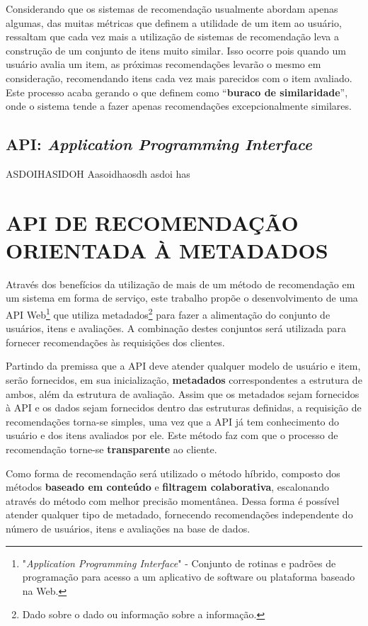 \documentclass[12pt, openright, oneside, a4paper, brazil]{abntex2}
\begin{document}
Considerando que os sistemas de recomendação usualmente abordam apenas algumas, das muitas métricas que definem a utilidade de um item ao usuário,  ressaltam que cada vez mais a utilização de sistemas de recomendação leva a construção de um conjunto de itens muito similar. Isso ocorre pois quando um usuário avalia um item, as próximas recomendações levarão o mesmo em consideração, recomendando itens cada vez mais parecidos com o item avaliado. Este processo acaba gerando o que  definem como “\textbf{buraco de similaridade}”, onde o sistema tende a fazer apenas recomendações excepcionalmente similares.

\section{API: \textit{Application Programming Interface}}

ASDOIHASIDOH Aasoidhaosdh asdoi has

%
%

\chapter{API DE RECOMENDAÇÃO ORIENTADA À METADADOS}

Através dos benefícios da utilização de mais de um método de recomendação em um sistema em forma de serviço, este trabalho propõe o desenvolvimento de uma API Web\footnote{"\textit{Application Programming Interface}" - Conjunto de rotinas e padrões de programação para acesso a um aplicativo de software ou plataforma baseado na Web.} que utiliza metadados\footnote{Dado sobre o dado ou informação sobre a informação.} para fazer a alimentação do conjunto de usuários, itens e avaliações. A combinação destes conjuntos será utilizada para fornecer recomendações às requisições dos clientes.

Partindo da premissa que a API deve atender qualquer modelo de usuário e item, serão fornecidos, em sua inicialização, \textbf{metadados} correspondentes a estrutura de ambos, além da estrutura de avaliação. Assim que os metadados sejam fornecidos à API e os dados sejam fornecidos dentro das estruturas definidas, a requisição de recomendações torna-se simples, uma vez que a API já tem conhecimento do usuário e dos itens avaliados por ele. Este método faz com que o processo de recomendação torne-se \textbf{transparente} ao cliente.

Como forma de recomendação será utilizado o método híbrido, composto dos métodos \textbf{baseado em conteúdo} e \textbf{filtragem colaborativa}, escalonando através do método com melhor precisão momentânea. Dessa forma é possível atender qualquer tipo de metadado, fornecendo recomendações independente do número de usuários, itens e avaliações na base de dados.
\end{document}
